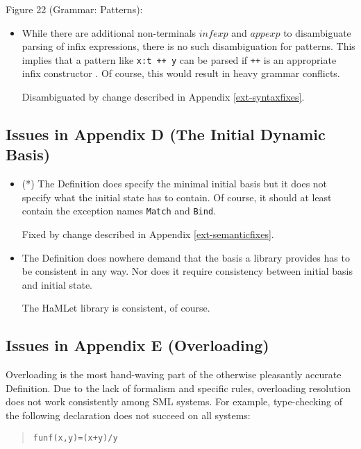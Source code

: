 \documentclass[twoside,titlepage]{article}
\begin{document}
\begin{appendix}
Figure 22 (Grammar: Patterns):

\begin{itemize}
\item While there are additional non-terminals $\mathit{infexp}$ and $\mathit{appexp}$ to disambiguate parsing of infix expressions, there is no such disambiguation for patterns. This implies that a pattern like {\tt x:t ++ y} can be parsed if {\tt ++} is an appropriate infix constructor \cite{addenda}. Of course, this would result in heavy grammar conflicts.

Disambiguated by change described in Appendix \ref{ext-syntaxfixes}.
\end{itemize}


\subsection{Issues in Appendix D (The Initial Dynamic Basis)}
\label{bugsappendixd}

\begin{itemize}

\item (*) The Definition does specify the minimal initial basis but it does not specify what the initial state has to contain. Of course, it should at least contain the exception names {\tt Match} and {\tt Bind}.

Fixed by change described in Appendix \ref{ext-semanticfixes}.

\item The Definition does nowhere demand that the basis a library provides has to be consistent in any way. Nor does it require consistency between initial basis and initial state.

The HaMLet library is consistent, of course.
\end{itemize}


\subsection{Issues in Appendix E (Overloading)}
\label{bugsappendixe}

Overloading is the most hand-waving part of the otherwise pleasantly accurate Definition. Due to the lack of formalism and specific rules, overloading resolution does not work consistently among SML systems. For example, type-checking of the following declaration does not succeed on all systems:

\begin{quote}
\begin{alltt}
fun f(x,y) = (x + y)/y
\end{alltt}
\end{quote}


\end{appendix}
\end{document}
